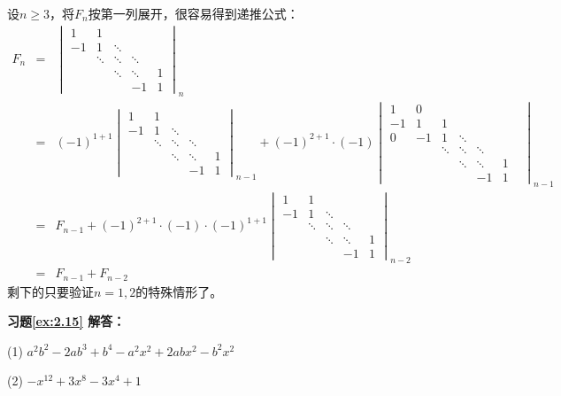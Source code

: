 \documentclass[a4paper]{book}
\newcommand{\enum}{\begin{list}{}{\setlength{\leftmargin}{0pt} \setlength{\itemindent}{2.5em} \setlength{\listparindent}{2em}}}
\begin{document}
设$n \geqslant 3$，将$F_n$按第一列展开，很容易得到递推公式：
\begin{eqnarray*}
F_n & = & \begin{vmatrix} 1 & 1 & & & \\ -1 & 1 & \ddots & & \\ & \ddots & \ddots & \ddots & \\ & & \ddots & \ddots & 1 \\ & & & -1 & 1 \end{vmatrix}_{n} \\
& = & (-1)^{1+1}\begin{vmatrix} 1 & 1 & & & \\ -1 & 1 & \ddots & & \\ & \ddots & \ddots & \ddots & \\ & & \ddots & \ddots & 1 \\ & & & -1 & 1 \end{vmatrix}_{n-1} + (-1)^{2+1}\cdot(-1)\begin{vmatrix} 1 & 0 & & & & & \\ -1 & 1 & 1 & & & \\ 0 & -1 & 1 & \ddots & & \\ & & \ddots & \ddots & \ddots & \\ & & & \ddots & \ddots & 1 \\ & & & & -1 & 1 \end{vmatrix}_{n-1} \\
& = & F_{n-1} + (-1)^{2+1}\cdot(-1)\cdot(-1)^{1+1}\begin{vmatrix} 1 & 1 & & & \\ -1 & 1 & \ddots & & \\ & \ddots & \ddots & \ddots & \\ & & \ddots & \ddots & 1 \\ & & & -1 & 1 \end{vmatrix}_{n-2} \\
& = & F_{n-1} + F_{n-2}
\end{eqnarray*}
剩下的只要验证$n = 1, 2$的特殊情形了。

\vspace{1.5em}

\textbf{习题\ref{ex:2.15} 解答：}

\enum
\item[(1)] $a^{2} b^{2} - 2 a b^{3} + b^{4} -  a^{2} x^{2} + 2 a b x^{2} -  b^{2} x^{2}$

\item[(2)] $-x^{12} + 3x^8 - 3x^4 + 1$
\end{list}
\end{document}
